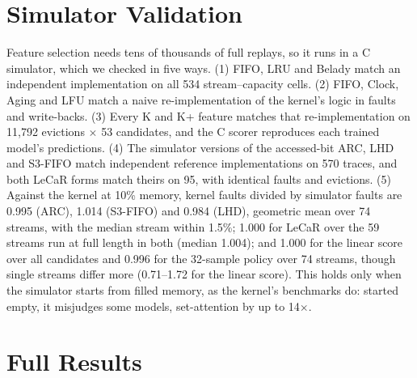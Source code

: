 \documentclass{article}
\newcommand{\clock}{Clock\xspace}
\newcommand{\belady}{Belady\xspace}
\newcommand{\tierK}{\textsf{K}\xspace}     %
\newcommand{\tierKp}{\textsf{K+}\xspace}   %
\newcommand{\wsixteen}{../week_16_update/tables}
\begin{document}
\section{Simulator Validation}
\label{app:sim}

Feature selection needs tens of thousands of full replays, so it runs in a C simulator,
which we checked in five ways. (1) FIFO, LRU and \belady match an independent
implementation on all 534 stream--capacity cells. (2) FIFO, \clock, Aging and LFU match a
naive re-implementation of the kernel's logic in faults and write-backs. (3) Every \tierK
and \tierKp feature matches that re-implementation on 11,792 evictions $\times$ 53
candidates, and the C scorer reproduces each trained model's predictions. (4) The
simulator versions of the accessed-bit ARC, LHD and S3-FIFO match independent reference
implementations on 570 traces, and both LeCaR forms match theirs on 95, with identical
faults and evictions. (5) Against the kernel at 10\% memory, kernel faults divided by
simulator faults are 0.995 (ARC), 1.014 (S3-FIFO) and 0.984 (LHD), geometric mean over
74 streams, with the median stream within 1.5\%; 1.000 for LeCaR over the 59 streams run
at full length in both (median 1.004); and 1.000 for the linear score over all candidates
and 0.996 for the 32-sample policy over 74 streams, though single streams differ more
(0.71--1.72 for the linear score). This holds only when the simulator starts from filled memory, as
the kernel's benchmarks do: started empty, it misjudges some models, set-attention by up
to 14$\times$.

\section{Full Results}
\label{app:results}

\begin{table}[h]
\caption{Every comparison with its 95\% interval, one random seed per comparison
(Table~\ref{tab:ci} shows the rows the text cites). Bold: the whole interval is below 1.
Every row covers all 74 streams at each size where it was run (the 16-sample score at 10\%
only).}
\label{tab:ci-full}
\vskip 0.05in
\begin{center}
\resizebox{\linewidth}{!}{}
\end{center}
\end{table}
\end{document}
